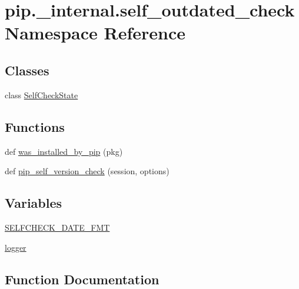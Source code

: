 \hypertarget{namespacepip_1_1__internal_1_1self__outdated__check}{}\section{pip.\+\_\+internal.\+self\+\_\+outdated\+\_\+check Namespace Reference}
\label{namespacepip_1_1__internal_1_1self__outdated__check}
\subsection*{Classes}
\begin{DoxyCompactItemize}
\item 
class \hyperlink{classpip_1_1__internal_1_1self__outdated__check_1_1SelfCheckState}{Self\+Check\+State}
\end{DoxyCompactItemize}
\subsection*{Functions}
\begin{DoxyCompactItemize}
\item 
def \hyperlink{namespacepip_1_1__internal_1_1self__outdated__check_ad0acb8c33b098e33468091effd105c54}{was\+\_\+installed\+\_\+by\+\_\+pip} (pkg)
\item 
def \hyperlink{namespacepip_1_1__internal_1_1self__outdated__check_afc5bffdf02b45d7ab26ab16c3345b7ac}{pip\+\_\+self\+\_\+version\+\_\+check} (session, options)
\end{DoxyCompactItemize}
\subsection*{Variables}
\begin{DoxyCompactItemize}
\item 
\hyperlink{namespacepip_1_1__internal_1_1self__outdated__check_a63a4eaaf96e7d5a46278098607cf4488}{S\+E\+L\+F\+C\+H\+E\+C\+K\+\_\+\+D\+A\+T\+E\+\_\+\+F\+MT}
\item 
\hyperlink{namespacepip_1_1__internal_1_1self__outdated__check_a588d105ffdaf709ec245d8bff02d38eb}{logger}
\end{DoxyCompactItemize}


\subsection{Function Documentation}
\mbox{\label{namespacepip_1_1__internal_1_1self__outdated__check_afc5bffdf02b45d7ab26ab16c3345b7ac}} 
